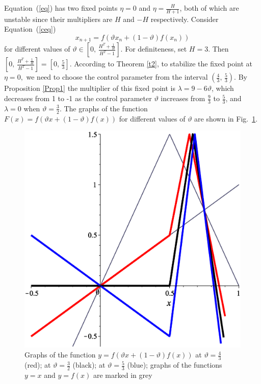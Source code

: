\documentclass[12pt,a4paper]{amsart}
\begin{document}
Equation~(\ref{eq}) has two fixed points $\eta = 0$ and $\eta = \frac{H}{H+1}$,  both of which are unstable since
their multipliers are $H$ and $-H$ respectively. Consider Equation~(\ref{ceq})
$$
x_{n+1} = f \left( \vartheta x_n + (1 - \vartheta)f(x_n) \right)
$$
for different values of $\vartheta \in \left[0,\, \frac{H^T + \frac{1}{H}}{H^T-1}\right].$ For definiteness, set $H=3.$
Then $\left[0,\, \frac{H^T + \frac{1}{H}}{H^T-1}\right] = \left[ 0,\,\frac53\right].$ According to Theorem \ref{t2},  to stabilize the fixed point at  $\eta=0,$
we need to choose the control parameter from the interval $\left(\frac43,\,\frac53\right)$.  By Proposition \ref{Prop1}  the multiplier of this fixed point is $\lambda = 9 - 6 \vartheta$, which decreases from 1 to -1 as the control parameter $\vartheta$ increases from $\frac{9}{3}$ to $\frac{5}{3}$, and $\lambda = 0$ when $\vartheta = \frac{3}{2}$.   The graphs of the function 
$F(x) = f \left( \vartheta x + (1 - \vartheta)f(x) \right)$ for different values of $\vartheta$ are shown in Fig.~\ref{f8}.

\begin{figure}[h!]
\centering
\includegraphics[scale=0.28]{Fig8}
\caption{Graphs of the function $y = f \left( \vartheta x + (1 - \vartheta)f(x) \right)$ at $\vartheta=\frac43$ (red);
at $\vartheta=\frac32$ (black); at $\vartheta=\frac53$ (blue); graphs of the functions $y=x$ and $y=f(x)$ 
are marked in grey} \label{f8}
\end{figure}
\end{document}
